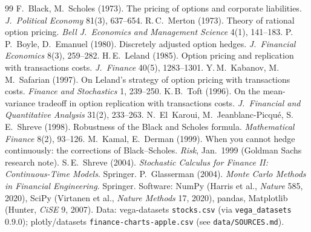 \documentclass[10pt,a4paper]{article}
\begin{document}
\begingroup\footnotesize
\renewcommand{\section}[2]{\vspace{2pt}\noindent\textbf{References}\par}
\begin{thebibliography}{99}\setlength{\itemsep}{0pt}
 F.~Black, M.~Scholes (1973). The pricing of options and corporate liabilities. \emph{J.\ Political Economy} 81(3), 637--654.
 R.\,C.~Merton (1973). Theory of rational option pricing. \emph{Bell J.\ Economics and Management Science} 4(1), 141--183.
 P.\,P.~Boyle, D.~Emanuel (1980). Discretely adjusted option hedges. \emph{J.\ Financial Economics} 8(3), 259--282.
 H.\,E.~Leland (1985). Option pricing and replication with transactions costs. \emph{J.\ Finance} 40(5), 1283--1301.
 Y.\,M.~Kabanov, M.\,M.~Safarian (1997). On Leland's strategy of option pricing with transactions costs. \emph{Finance and Stochastics} 1, 239--250.
 K.\,B.~Toft (1996). On the mean-variance tradeoff in option replication with transactions costs. \emph{J.\ Financial and Quantitative Analysis} 31(2), 233--263.
 N.~El~Karoui, M.~Jeanblanc-Picqu\'e, S.\,E.~Shreve (1998). Robustness of the Black and Scholes formula. \emph{Mathematical Finance} 8(2), 93--126.
 M.~Kamal, E.~Derman (1999). When you cannot hedge continuously: the corrections of Black--Scholes. \emph{Risk}, Jan.\ 1999 (Goldman Sachs research note).
 S.\,E.~Shreve (2004). \emph{Stochastic Calculus for Finance II: Continuous-Time Models}. Springer.
 P.~Glasserman (2004). \emph{Monte Carlo Methods in Financial Engineering}. Springer.
 Software: NumPy (Harris et al., \emph{Nature} 585, 2020), SciPy (Virtanen et al., \emph{Nature Methods} 17, 2020), pandas, Matplotlib (Hunter, \emph{CiSE} 9, 2007).
Data: vega-datasets \texttt{stocks.csv} (via \texttt{vega\_datasets} 0.9.0); plotly/datasets \texttt{finance-charts-apple.csv} (see \texttt{data/SOURCES.md}).
\end{thebibliography}
\endgroup
{}
\end{document}
